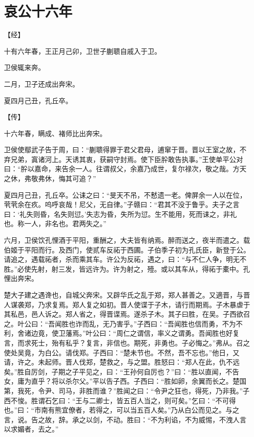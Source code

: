 \documentclass[a4paper,12pt,UTF8,twoside]{ctexbook}
\begin{document}
\section{哀公十六年}



【经】

十有六年春，王正月己卯，卫世子蒯聩自戚入于卫。

卫侯辄来奔。

二月，卫子还成出奔宋。

夏四月己丑，孔丘卒。

【传】

十六年春，瞒成、褚师比出奔宋。

卫侯使鄢武子告于周，曰：“蒯聩得罪于君父君母，逋窜于晋。晋以王室之故，不弃兄弟，寘诸河上。天诱其衷，获嗣守封焉。使下臣肸敢告执事。”王使单平公对曰：“肸以嘉命，来告余一人。往谓叔父，余嘉乃成世，复尔禄次，敬之哉。方天之休，弗敬弗休，悔其可追？”

夏四月己丑，孔丘卒。公诔之曰：“旻天不吊，不慭遗一老。俾屏余一人以在位，茕茕余在疚。呜呼哀哉！尼父，无自律。”子赣曰：“君其不没于鲁乎。夫子之言曰：‘礼失则昏，名失则愆。’失志为昏，失所为愆。生不能用，死而诔之，非礼也。称一人，非名也。君两失之。”

六月，卫侯饮孔悝酒于平阳，重酬之，大夫皆有纳焉。醉而送之，夜半而遣之。载伯姬于平阳而行。及西门，使贰车反祏于西圃。子伯季子初为孔氏臣，新登于公。请追之，遇载祏者，杀而乘其车。许公为反祏，遇之，曰：“与不仁人争，明无不胜。”必使先射，射三发，皆远许为。许为射之，殪。或以其车从，得祏于橐中。孔悝出奔宋。

楚大子建之遇谗也，自城父奔宋。又辟华氏之乱于郑，郑人甚善之。又適晋，与晋人谋袭郑，乃求复焉。郑人复之如初。晋人使谍于子木，请行而期焉。子木暴虐于其私邑，邑人诉之。郑人省之，得晋谍焉。遂杀子木。其子曰胜，在吴。子西欲召之。叶公曰：“吾闻胜也诈而乱，无乃害乎。”子西曰：“吾闻胜也信而勇，不为不利，舍诸边竟，使卫藩焉。”叶公曰：“周仁之谓信，率义之谓勇。吾闻胜也好复言，而求死士，殆有私乎？复言，非信也。期死，非勇也。子必悔之。”弗从。召之使处吴竟，为白公。请伐郑。子西曰：“楚未节也。不然，吾不忘也。”他日，又请，许之。未起师。晋人伐郑，楚救之，与之盟。胜怒曰：“郑人在此，仇不远矣。”胜自厉剑，子期之子平见之，曰：“王孙何自厉也？”曰：“胜以直闻，不告女，庸为直乎？将以杀尔父。”平以告子西。子西曰：“胜如卵，余翼而长之。楚国第，我死，令尹、司马，非胜而谁？”胜闻之曰：“令尹之狂也，得死，乃非我。”子西不悛。胜谓石乞曰：“王与二卿士，皆五百人当之，则可矣。”乞曰：“不可得也。”曰：“市南有熊宜僚者，若得之，可以当五百人矣。”乃从白公而见之。与之言，说。告之故，辞。承之以剑，不动。胜曰：“不为利谄，不为威惕，不洩人言以求媚者，去之。”
\end{document}

